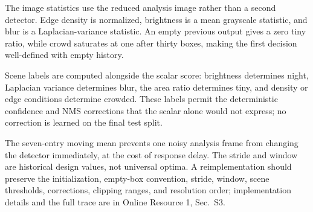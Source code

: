 The image statistics use the reduced analysis image rather than a second
detector. Edge density is normalized, brightness is a mean grayscale statistic,
and blur is a Laplacian-variance statistic. An empty previous output gives a
zero tiny ratio, while crowd saturates at one after thirty boxes, making the
first decision well-defined with empty history.

Scene labels are computed alongside the scalar score: brightness determines
night, Laplacian variance determines blur, the area ratio determines tiny, and
density or edge conditions determine crowded. These labels permit the
deterministic confidence and NMS corrections that the scalar alone would not
express; no correction is learned on the final test split.

The seven-entry moving mean prevents one noisy analysis frame from changing the
detector immediately, at the cost of response delay. The stride and window are
historical design values, not universal optima. A reimplementation should
preserve the initialization, empty-box convention, stride, window, scene
thresholds, corrections, clipping ranges, and resolution order; implementation
details and the full trace are in Online Resource 1, Sec.~S3.
